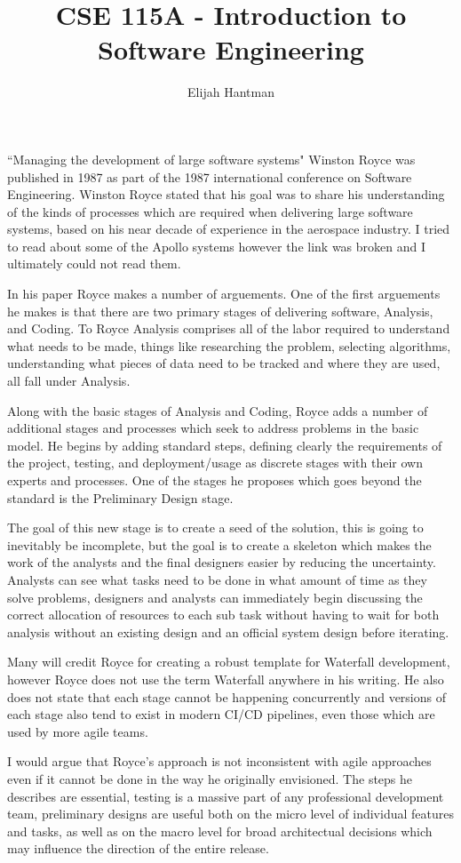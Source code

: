 \documentclass{report}
\title{\Huge{CSE 115A - Introduction to Software Engineering}}
\author{\huge{Elijah Hantman}}
\date{}
\begin{document}
\maketitle
\newpage


“Managing the development of large software systems" Winston Royce was published in
1987 as part of the 1987 international conference on Software Engineering.
Winston Royce stated that his goal was to share his understanding of the kinds of processes
which are required when delivering large software systems, based on his near decade
of experience in the aerospace industry. I tried to read about some of the Apollo systems
however the link was broken and I ultimately could not read them.

In his paper Royce makes a number of arguements.
One of the first arguements he makes is that there are two primary stages of delivering
software, Analysis, and Coding. To Royce Analysis comprises all of the labor required to
understand what needs to be made, things like researching the problem, selecting algorithms,
understanding what pieces of data need to be tracked and where they are used, all fall under
Analysis.

Along with the basic stages of Analysis and Coding, Royce adds a number of additional stages and
processes which seek to address problems in the basic model. He begins by adding standard steps,
defining clearly the requirements of the project, testing, and deployment/usage as discrete
stages with their own experts and processes. One of the stages he proposes which goes beyond the
standard is the Preliminary Design stage.

The goal of this new stage is to create a seed of the solution, this is going to inevitably
be incomplete, but the goal is to create a skeleton which makes the work of the analysts and
the final designers easier by reducing the uncertainty. Analysts can see what tasks need to
be done in what amount of time as they solve problems, designers and analysts can immediately
begin discussing the correct allocation of resources to each sub task without having to wait
for both analysis without an existing design and an official system design before iterating.

Many will credit Royce for creating a robust template for Waterfall development, however
Royce does not use the term Waterfall anywhere in his writing. He also does not state that
each stage cannot be happening concurrently and versions of each stage also tend to exist
in modern CI/CD pipelines, even those which are used by more agile teams.

I would argue that Royce's approach is not inconsistent with agile approaches even if it
cannot be done in the way he originally envisioned. The steps he describes are essential,
testing is a massive part of any professional development team, preliminary designs are useful
both on the micro level of individual features and tasks, as well as on the macro level for
broad architectual decisions which may influence the direction of the entire release.
\end{document}
